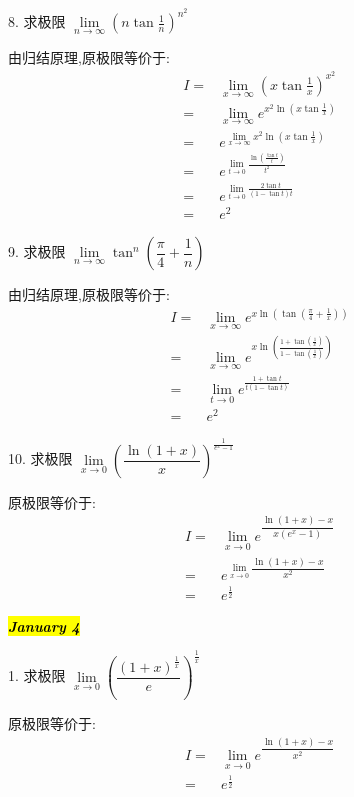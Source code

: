 8. 求极限 $\lim\limits_{n\to \infty}(n\tan\frac{1}{n})^{n^{2}}$
\begin{solution}
	
	由归结原理,原极限等价于:
	\begin{align*}
		I = & \lim\limits_{x\to \infty}(x\tan\frac{1}{x})^{x^{2}}\\
		  = & \lim\limits_{x\to \infty}e^{x^{2}\ln(x\tan\frac{1}{x})}\\
		  = & e^{\lim\limits_{x\to \infty}x^{2}\ln(x\tan\frac{1}{x})}\\
		  = & e^{\lim\limits_{t\to 0}\frac{\ln(\frac{\tan t}{t})}{t^{2}}}\\
		  = & e^{\lim\limits_{t\to 0}\frac{2\tan t}{(1-\tan t)t}}\\
		  = & e^{2}
	\end{align*}
\end{solution}

9. 求极限 $\lim\limits_{n\to \infty}\tan^{n}\left( \dfrac{\pi}{4}+\dfrac{1}{n}\right)$
\begin{solution}
	
	由归结原理,原极限等价于:
	\begin{align*}
		I = & \lim\limits_{x\to \infty}e^{x\ln(\tan(\frac{\pi}{4}+\frac{1}{x}))}\\
		  = & \lim\limits_{x\to \infty}e^{x\ln(\frac{1+\tan(\frac{1}{x})}{1-\tan(\frac{1}{x})})}\\
		  = & \lim\limits_{t\to 0}e^{\frac{1+\tan t}{t(1-\tan t)}}\\
		  = & e^{2}
	\end{align*}
\end{solution}

10. 求极限 $\lim\limits_{x\to 0}\left( \dfrac{\ln(1+x)}{x}\right)^{\frac{1}{e^{x}-1}}$
\begin{solution}
	
	原极限等价于:
	\begin{align*}
		I = & \lim\limits_{x\to 0}e^{\dfrac{\ln(1+x)-x}{x(e^{x}-1)}}\\
		  = & e^{\lim\limits_{x\to 0}\dfrac{\ln(1+x)-x}{x^{2}}}\\
		  = & e^{\frac{1}{2}}
	\end{align*}
\end{solution}

\hl{\textbf{\textit{January 4}}}

1. 求极限 $\lim\limits_{x\to 0}\left( \dfrac{(1+x)^{\frac{1}{x}}}{e}\right)^{\frac{1}{x}}$
\begin{solution}

	原极限等价于:
	\begin{align*}
		I = & \lim\limits_{x\to 0}e^{\dfrac{\ln(1+x)-x}{x^{2}}}\\
		  = & e^{\frac{1}{2}}
	\end{align*}
\end{solution}

